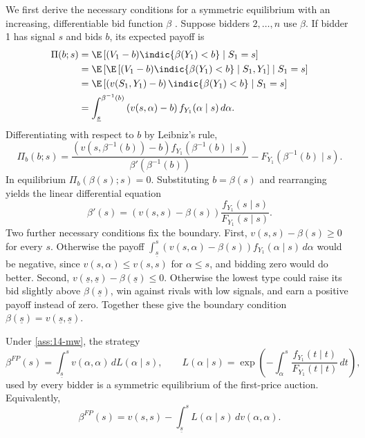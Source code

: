 We first derive the necessary conditions for a symmetric equilibrium with an increasing, differentiable bid
function $\beta$ \citep[p.~1106, following \citealp{Wilson1977}]{MilgromWeber1982}. Suppose bidders
$2,\dots,n$ use $\beta$. If bidder 1 has signal $s$ and bids $b$, its expected payoff is
\begin{align*}
  \Pi(b;s)&=\E\left[(V_1-b)\indic\{\beta(Y_1)<b\}\mid S_1=s\right]\\
  &=\E\left[\E\left[(V_1-b)\indic\{\beta(Y_1)<b\}\mid S_1,Y_1\right]\mid S_1=s\right]\\
  &=\E\left[\left(v(S_1,Y_1)-b\right)\indic\{\beta(Y_1)<b\}\mid S_1=s\right]\\
  &=\int_{\underline s}^{\beta^{-1}(b)}\left(v(s,\alpha)-b\right)f_{Y_1}(\alpha\mid s)\,d\alpha.
\end{align*}
Differentiating with respect to $b$ by Leibniz's rule,
\begin{equation*}
  \Pi_b(b;s)=\frac{\left(v(s,\beta^{-1}(b))-b\right)f_{Y_1}(\beta^{-1}(b)\mid s)}{\beta'(\beta^{-1}(b))}
  -F_{Y_1}(\beta^{-1}(b)\mid s).
\end{equation*}
In equilibrium $\Pi_b(\beta(s);s)=0$. Substituting $b=\beta(s)$ and rearranging yields the linear
differential equation \citep[eq.~(7)]{MilgromWeber1982}
\begin{equation}\label{eq:14-mw-ode}
  \beta'(s)=\left(v(s,s)-\beta(s)\right)\frac{f_{Y_1}(s\mid s)}{F_{Y_1}(s\mid s)}.
\end{equation}
Two further necessary conditions fix the boundary. First, $v(s,s)-\beta(s)\ge0$ for every $s$. Otherwise the
payoff $\int_{\underline s}^s(v(s,\alpha)-\beta(s))f_{Y_1}(\alpha\mid s)\,d\alpha$ would be negative, since
$v(s,\alpha)\le v(s,s)$ for $\alpha\le s$, and bidding zero would do better. Second,
$v(\underline s,\underline s)-\beta(\underline s)\le0$. Otherwise the lowest type could raise its bid slightly
above $\beta(\underline s)$, win against rivals with low signals, and earn a positive payoff instead of zero.
Together these give the boundary condition $\beta(\underline s)=v(\underline s,\underline s)$.

\begin{proposition}\label{prop:14-mw-fpa}
Under \cref{ass:14-mw}, the strategy
\begin{equation}\label{eq:14-mw-fpa-bid}
  \beta^{FP}(s)=\int_{\underline s}^{s}v(\alpha,\alpha)\,dL(\alpha\mid s),
  \qquad
  L(\alpha\mid s)=\exp\left(-\int_\alpha^s\frac{f_{Y_1}(t\mid t)}{F_{Y_1}(t\mid t)}\,dt\right),
\end{equation}
used by every bidder is a symmetric equilibrium of the first-price auction. Equivalently,
\begin{equation}\label{eq:14-mw-fpa-bid2}
  \beta^{FP}(s)=v(s,s)-\int_{\underline s}^sL(\alpha\mid s)\,dv(\alpha,\alpha).
\end{equation}
\end{proposition}

